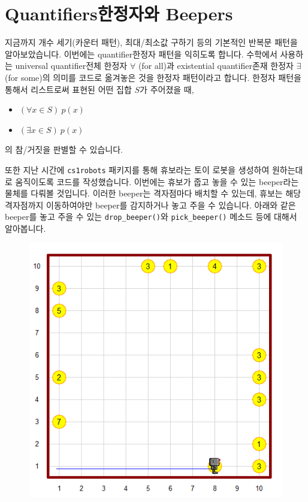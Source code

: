 \documentclass[../main.tex]{subfiles}
\begin{document}
\section{Quantifiers한정자와 Beepers}
지금까지 개수 세기(카운터 패턴), 최대/최소값 구하기 등의 기본적인 반복문 패턴을 알아보았습니다.
이번에는 quantifier한정자 패턴을 익히도록 합니다.
수학에서 사용하는 universal quantifier전체 한정자 $\forall$ (for all)과 existential quantifier존재 한정자 $\exists$ (for some)의 의미를 코드로 옮겨놓은 것을 한정자 패턴이라고 합니다.
한정자 패턴을 통해서 리스트로써 표현된 어떤 집합 $S$가 주어졌을 때,
\begin{itemize}
\item $(\forall x \in S)\ p(x)$
\item $(\exists x \in S)\ p(x)$
\end{itemize}
의 참/거짓을 판별할 수 있습니다.

또한 지난 시간에 \texttt{cs1robots} 패키지를 통해 휴보라는 토이 로봇을 생성하여 원하는대로 움직이도록 코드를 작성했습니다.
이번에는 휴보가 줍고 놓을 수 있는 beeper라는 물체를 다뤄볼 것입니다.
이러한 beeper는 격자점마다 배치할 수 있는데, 휴보는 해당 격자점까지 이동하여야만 beeper를 감지하거나 놓고 주을 수 있습니다.
아래와 같은 beeper를 놓고 주을 수 있는 \texttt{drop\_beeper()}와 \texttt{pick\_beeper()} 메소드 등에 대해서 알아봅니다.
\begin{figure}[H]
\centering
\includegraphics[width=0.5\linewidth]{"./lectures/lecture5_beeper"}
\label{fig:lecture5beeper}
\end{figure}
\end{document}
